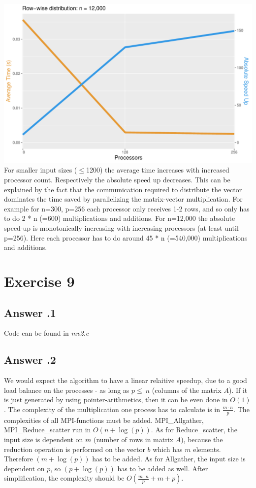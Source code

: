 \documentclass[a4paper,%
11pt,%
DIV=12,
headsepline,%
headings=normal,
]{scrartcl}
\newcounter{curex}
\newcommand{\exercise}[1]{\section*{Exercise #1}\setcounter{curex}{#1}}
\newcommand{\answer}[1]{\subsection*{Answer \arabic{curex}.#1}}
\begin{document}
\includegraphics[scale=0.4,page=1]{../plots/matrix_vector_plot_Row-wise-distribution_12000} \\

\noindent For smaller input sizes ($\leq$1200) the average time increases with increased processor count. Respectively the absolute speed up decreases. This can be explained by the fact that the communication required to distribute the vector dominates the time saved by parallelizing the matrix-vector multiplication. For example for n=300, p=256 each processor only receives 1-2 rows, and so only has to do 2 * n (=600) multiplications and additions. For n=12,000 the absolute speed-up is monotonically increasing with increasing processors (at least until p=256). Here each processor has to do around 45 * n (=540,000) multiplications and additions.

\exercise{9}

\answer{1}
Code can be found in \textit{mv2.c}
\answer{2}
We would expect the algorithm to have a linear relaitive speedup, due to a good load balance on the processes - as long as $p \leq\ n$  (columns of the matrix $A$). 
If it is just generated by using pointer-arithmetics, then  it can be even done in $O\left(1\right)$. The complexity of the multiplication one process has to calculate is in $\frac{m \cdot n}{p}$. The complexities of all MPI-functions must be added. MPI\_Allgather,  MPI\_Reduce\_scatter run in $O(n + \log(p))$. As for Reduce\_scatter, the input size is dependent on $m$ (number of rows in matrix $A$), because the reduction operation is performed on the vector $b$ which has $m$ elements. Therefore $(m + \log(p))$ has to be added. As for Allgather, the input size is dependent on $p$, so $(p + \log(p))$ has to be added as well. After simplification, the complexity should be $O\left(\frac{m \cdot n}{p} + m + p\right)$.\\
\end{document}
